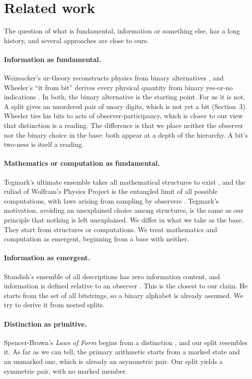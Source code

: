 \documentclass[11pt]{article}
\begin{document}
\section{Related work}
The question of what is fundamental, information or something else, has a
long history, and several approaches are close to ours.

\paragraph{Information as fundamental.}
Weizsacker's ur-theory reconstructs physics from binary alternatives
\cite{lyre2003}, and Wheeler's ``it from bit'' derives every physical
quantity from binary yes-or-no indications \cite{wheeler1990}. In both,
the binary alternative is the starting point. For us it is not. A split
gives an unordered pair of unary digits, which is not yet a bit
(Section~3). Wheeler ties his bits to acts of observer-participancy, which
is closer to our view that distinction is a reading. The difference is
that we place neither the observer nor the binary choice in the base: both
appear at a depth of the hierarchy. A bit's two-ness is itself a reading.

\paragraph{Mathematics or computation as fundamental.}
Tegmark's ultimate ensemble takes all mathematical structures to exist
\cite{tegmark1998}, and the ruliad of Wolfram's Physics Project is the
entangled limit of all possible computations, with laws arising from
sampling by observers \cite{rickles2023}. Tegmark's motivation, avoiding an
unexplained choice among structures, is the same as our principle that
nothing is left unexplained. We differ in what we take as the base. They
start from structures or computations. We treat mathematics and
computation as emergent, beginning from a base with neither.

\paragraph{Information as emergent.}
Standish's ensemble of all descriptions has zero information content, and
information is defined relative to an observer \cite{standish2004}. This is
the closest to our claim. He starts from the set of all bitstrings, so a
binary alphabet is already assumed. We try to derive it from nested splits.

\paragraph{Distinction as primitive.}
Spencer-Brown's \emph{Laws of Form} begins from a distinction
\cite{spencerbrown1969}, and our split resembles it. As far as we can tell,
the primary arithmetic starts from a marked state and an unmarked one,
which is already an asymmetric pair. Our split yields a symmetric pair,
with no marked member.
\end{document}
